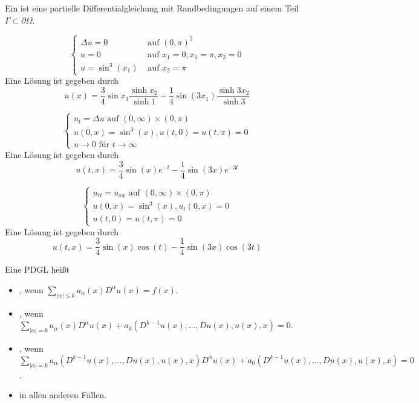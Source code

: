 \begin{defn}\label{def_pdgl_problem}
	Ein  ist eine partielle Differentialgleichung mit Randbedingungen auf einem Teil $\Gamma \subset \partial \Omega$.
\end{defn}
	
\begin{bsp}
	\[ \begin{cases}
		\Delta u = 0 & \text{ auf } (0,\pi)^2 \\
		u = 0 & \text{ auf } x_1=0, x_1=\pi, x_2 = 0 \\
		u = \sin^3(x_1) & \text{ auf } x_2 = \pi
		\end{cases} \]
		Eine Lösung ist gegeben durch
		\[ u(x) = \frac{3}{4} \sin x_1 \frac{\sinh x_2}{\sinh 1} - \frac{1}{4} \sin(3x_1) \frac{\sinh 3x_2}{\sinh 3} \]
		
	\[ \begin{cases}
		u_t = \Delta u \text{ auf } (0,\infty) \times (0, \pi) \\
		u(0,x) = \sin^3 (x), u(t,0) = u(t,\pi) = 0 \\
		u \rightarrow 0 \text{ für } t \rightarrow \infty
		\end{cases} \]
		Eine Lösung ist gegeben durch
		\[ u(t,x) = \frac{3}{4} \sin(x) e^{-t} - \frac{1}{4} \sin(3x) e^{-3t} \]
		
	\[ \begin{cases}
		u_{tt} = u_{xx} \text{ auf } (0,\infty) \times (0, \pi) \\
		u(0,x) = \sin^3(x), u_t (0,x) = 0 \\
		u(t,0) = u(t,\pi) = 0
		\end{cases} \]
		Eine Lösung ist gegeben durch
		\[ u(t,x) = \frac{3}{4} \sin (x) \cos (t) - \frac{1}{4} \sin (3x) \cos (3t) \]
\end{bsp}

\begin{defn} \label{def_pdgl_typen}
	Eine PDGL heißt    
	\begin{itemize}
		\item {}, wenn $\sum\limits_{|\alpha| \leq k} a_\alpha (x) D^\alpha u(x) = f(x)$.
		\item {}, wenn $\sum\limits_{|\alpha| = k} a_\alpha (x) D^\alpha u(x) + a_0(D^{k-1} u(x),\dots,Du(x),u(x),x) = 0$.
		\item {}, wenn $\sum\limits_{|\alpha| = k} a_\alpha(D^{k-1} u(x), \dots, Du(x),u(x),x)D^\alpha u(x) + a_0(D^{k-1}u(x),\dots,Du(x),u(x),x) = 0$.
		\item {} in allen anderen Fällen.
	\end{itemize}
\end{defn}
	
